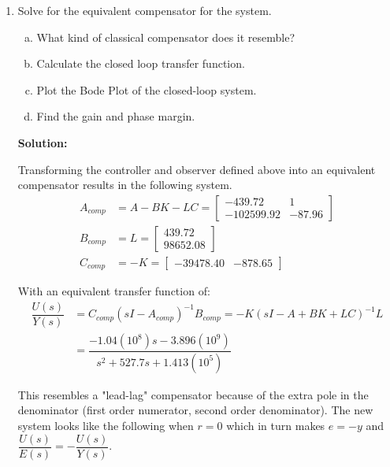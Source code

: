 \documentclass[11pt]{article}
\newcommand{\solution}{\textbf{Solution: \\}}
\begin{document}
\begin{enumerate}[label=\textbf{\arabic*.}]
  \vspace{24pt}
  \item Solve for the equivalent compensator for the system.
  \begin{enumerate}[(a)]
    \itemsep -6pt
    \item What kind of classical compensator does it resemble?
    \item Calculate the closed loop transfer function.
    \item Plot the Bode Plot of the closed-loop system.
    \item Find the gain and phase margin.
  \end{enumerate}
  \solution

  Transforming the controller and observer defined above into an equivalent 
  compensator results in the following system.
  \begin{equation}
    \begin{split}
      A_{comp} &= A - BK - LC =
      \begin{bmatrix}
        -439.72 & 1 \\ -102599.92 & -87.96
      \end{bmatrix} \\
      B_{comp} &= L =
      \begin{bmatrix}
        439.72 \\ 98652.08
      \end{bmatrix} \\
      C_{comp} &= -K =
      \begin{bmatrix}
        -39478.40 & -878.65
      \end{bmatrix}
    \end{split}
  \end{equation}

  With an equivalent transfer function of:
  \begin{equation}
    \begin{split}
      \dfrac{U(s)}{Y(s)} & = C_{comp}(sI-A_{comp})^{-1}B_{comp} 
      = -K(sI - A + BK + LC)^{-1}L \\
      &= \dfrac{-1.04(10^8)s - 3.896(10^9)}{s^2 + 527.7s + 1.413(10^5)}
    \end{split}
  \end{equation}

  This resembles a "lead-lag" compensator because of the extra pole in the 
  denominator (first order numerator, second order denominator). The new system 
  looks like the following when $r=0$ which in turn makes $e=-y$ and 
  $\dfrac{U(s)}{E(s)} = -\dfrac{U(s)}{Y(s)}$.


\end{enumerate}
\end{document}

